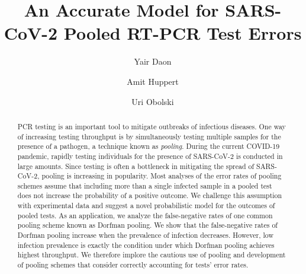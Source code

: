 \documentclass{article}
\begin{document}
\title{An Accurate Model for SARS-CoV-2 Pooled RT-PCR Test Errors}

\author[1,2]{Yair Daon}
\author[1,3,*]{Amit Huppert}
\author[1,2,*]{Uri Obolski}



\date{}

\maketitle

\begin{abstract}
PCR testing is an important tool to mitigate outbreaks of infectious
diseases. One way of increasing testing throughput is by
simultaneously testing multiple samples for the presence of a
pathogen, a technique known as \emph{pooling}. During the current
COVID-19 pandemic, rapidly testing individuals for the presence of
SARS-CoV-2 is conducted in large amounts. Since testing is often a
bottleneck in mitigating the spread of SARS-CoV-2, pooling is
increasing in popularity. Most analyses of the error rates of pooling
schemes assume that including more than a single infected sample in a
pooled test does not increase the probability of a positive
outcome. We challenge this assumption with experimental data and
suggest a novel probabilistic model for the outcomes of pooled
tests. As an application, we analyze the false-negative rates of one
common pooling scheme known as Dorfman pooling. We show that the
false-negative rates of Dorfman pooling increase when the prevalence
of infection decreases. However, low infection prevalence is exactly
the condition under which Dorfman pooling achieves highest
throughput. We therefore implore the cautious use of pooling and
development of pooling schemes that consider correctly accounting for
tests' error rates.
\end{abstract}
\newpage
\end{document}

